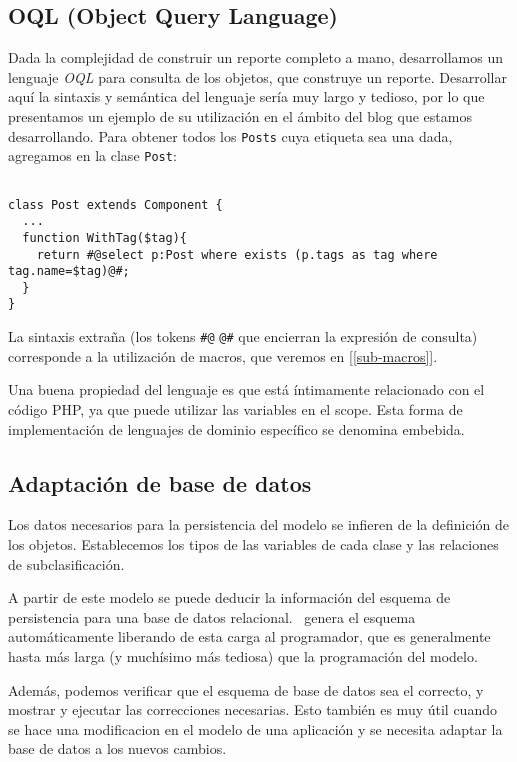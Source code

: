 \subsection{OQL (Object Query Language)}
\label{sub-oql}
Dada la complejidad de construir un reporte completo a mano, desarrollamos un lenguaje \emph{OQL} para consulta de los objetos, que construye un reporte. Desarrollar aquí la sintaxis y semántica del lenguaje sería muy largo y tedioso, por lo que presentamos un ejemplo de su utilización en el ámbito del blog que estamos desarrollando. Para obtener todos los \verb"Posts" cuya etiqueta sea una dada, agregamos en la clase \verb"Post":

\begin{verbatim}

class Post extends Component {
  ...
  function WithTag($tag){
    return #@select p:Post where exists (p.tags as tag where tag.name=$tag)@#;
  }
}

\end{verbatim}

La sintaxis extraña (los tokens \verb"#@" \verb"@#" que encierran la expresión de consulta) corresponde a la utilización de macros, que veremos en [\ref{sub-macros}].

Una buena propiedad del lenguaje es que está íntimamente relacionado con el código PHP, ya que puede utilizar las variables en el scope. Esta forma de implementación de lenguajes de dominio específico se denomina embebida.

\subsection{Adaptación de base de datos}
\label{sub-adapt}
Los datos necesarios para la persistencia del modelo se infieren de la definición de los objetos. Establecemos los tipos de las variables de cada clase y las relaciones de subclasificación.

A partir de este modelo se puede deducir la información del esquema de persistencia para una base de datos relacional. \PWB \ genera el esquema automáticamente liberando de esta carga al programador, que es generalmente hasta más larga (y muchísimo más tediosa) que la programación del modelo.

Además, podemos verificar que el esquema de base de datos sea el correcto, y mostrar y ejecutar las correcciones necesarias. Esto también es muy útil cuando se hace una modificacion en el modelo de una aplicación y se necesita adaptar la base de datos a los nuevos cambios.

